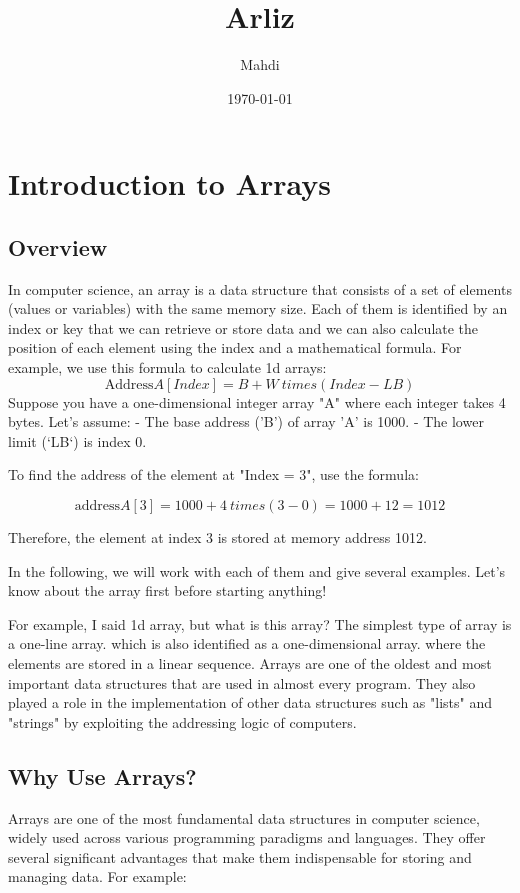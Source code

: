 \documentclass{book}
\title{{\Huge Arliz}}
\author{{\LARGE Mahdi}}
\date{{\large \today}}
\begin{document}
	
	\maketitle
	\tableofcontents
	
\chapter{Introduction to Arrays}
	
\section{Overview}
In computer science, an array is a data structure that consists of a set of elements (values ​​or variables) with the same memory size. Each of them is identified by an index or key that we can retrieve or store data and we can also calculate the position of each element using the index and a mathematical formula.
For example, we use this formula to calculate 1d arrays:
\[\text{Address} A[Index] = B + W \ times (Index - LB)\]
Suppose you have a one-dimensional integer array "A" where each integer takes 4 bytes. Let's assume:
- The base address ('B') of array 'A' is 1000.
- The lower limit (`LB`) is index 0.

To find the address of the element at "Index = 3", use the formula:

\[\text{address} A[3] = 1000 + 4 \ times (3 - 0) = 1000 + 12 = 1012\]

Therefore, the element at index 3 is stored at memory address 1012.

In the following, we will work with each of them and give several examples. Let's know about the array first before starting anything!

For example, I said 1d array, but what is this array?
The simplest type of array is a one-line array. which is also identified as a one-dimensional array. where the elements are stored in a linear sequence. Arrays are one of the oldest and most important data structures that are used in almost every program. They also played a role in the implementation of other data structures such as "lists" and "strings" by exploiting the addressing logic of computers.

\section{Why Use Arrays?}

Arrays are one of the most fundamental data structures in computer science, widely used across various programming paradigms and languages. They offer several significant advantages that make them indispensable for storing and managing data.  For example:
\end{document}
